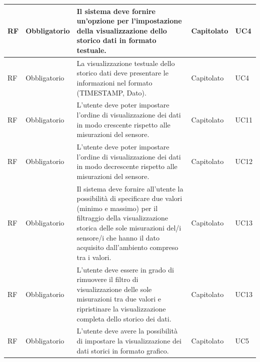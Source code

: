 \documentclass{article}
\begin{document}
\begin{longtable}{|C{1cm}|C{2cm}|>{\raggedright}m{5cm}|C{1.5cm}|C{2cm}|}
    \hline

     RF & Obbligatorio        & Il sistema deve fornire un'opzione per l'impostazione della visualizzazione dello storico dati in formato testuale.                                                                                                                & Capitolato      & UC4               \\
    \hline
     RF & Obbligatorio        & La visualizzazione testuale dello storico dati deve presentare le informazioni nel formato (TIMESTAMP, Dato).                                                                                                                      & Capitolato      & UC4               \\
    \hline
     RF & Obbligatorio        & L'utente deve poter impostare l'ordine di visualizzazione dei dati in modo crescente rispetto alle misurazioni del sensore.    & Capitolato      & UC11               \\
    \hline
     RF & Obbligatorio        & L'utente deve poter impostare l'ordine di visualizzazione dei dati in modo decrescente rispetto alle misurazioni del sensore.    & Capitolato      & UC12               \\
    \hline
     RF & Obbligatorio        &  Il sistema deve fornire all'utente la possibilità di specificare due valori (minimo e massimo) per il filtraggio della visualizzazione storica delle sole misurazioni del/i sensore/i che hanno il dato acquisito dall'ambiento compreso tra i valori.       & Capitolato      & UC13               \\
    \hline
     RF & Obbligatorio        &  L'utente deve essere in grado di rimuovere il filtro di visualizzazione delle sole misurazioni tra due valori e ripristinare la visualizzazione completa dello storico dei dati.    & Capitolato      & UC13               \\
    \hline
     RF & Obbligatorio        & L'utente deve avere la possibilità di impostare la visualizzazione dei dati storici in formato grafico.                                                                                                                   & Capitolato      & UC5               \\

\end{longtable}
\end{document}
